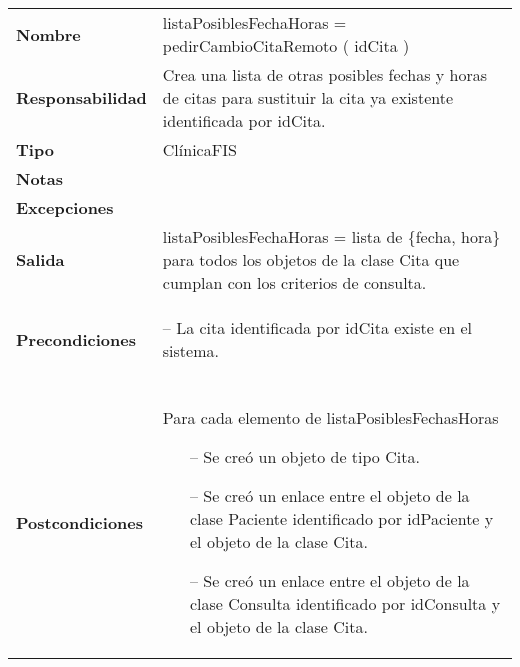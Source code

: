  \begin{table}[H]
  \centering
  \begin{tabularx}{\textwidth}{l|X}
    \textbf{Nombre}        &  listaPosiblesFechaHoras = pedirCambioCitaRemoto ( idCita ) \\ 
    \textbf{Responsabilidad}  &  Crea una lista de otras posibles fechas y horas
    de citas para sustituir la cita ya existente identificada por idCita.\\ 
    \textbf{Tipo}        &  ClínicaFIS \\ 
    \textbf{Notas}        &  \\ 
    \textbf{Excepciones}    & \\
    \textbf{Salida}        &  listaPosiblesFechaHoras = lista de \{fecha, hora\} para todos los objetos de la clase Cita que cumplan con los criterios de consulta. \\ 
    \textbf{Precondiciones}    &
    \begin{itemizenomargins}
    \item[--] La cita identificada por idCita existe en el sistema.
    \end{itemizenomargins} \\ \\
    \textbf{Postcondiciones}  & Para cada elemento de listaPosiblesFechasHoras
     \begin{itemize}
    \item[--] Se creó un objeto de tipo Cita.
    \item[--] Se creó un enlace entre el objeto de la clase Paciente identificado
      por idPaciente y el objeto de la clase Cita.
    \item[--] Se creó un enlace entre el objeto de la clase Consulta identificado
      por idConsulta y el objeto de la clase Cita.
    \end{itemize}
  \end{tabularx}
\end{table}

